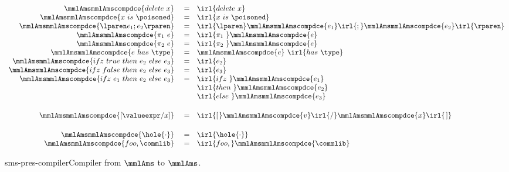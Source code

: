 \documentclass[a4paper,names,dvipsnames]{article}
\begin{document}
{\begin{center}
$$\begin{array}{rll}
    \mmlAmsmmlAmscompdce{delete\ x} &\ = & \irl{delete\ x} \\
    \mmlAmsmmlAmscompdce{x\ is\ \poisoned} &\ = & \irl{x\ is\ \poisoned} \\
    \mmlAmsmmlAmscompdce{\lparen e_1;e_2\rparen} &\ = & \irl{\lparen}\mmlAmsmmlAmscompdce{e_1}\irl{;}\mmlAmsmmlAmscompdce{e_2}\irl{\rparen}\\
    \mmlAmsmmlAmscompdce{\pi_1\ e} &\ = & \irl{\pi_1\ }\mmlAmsmmlAmscompdce{e}\\
    \mmlAmsmmlAmscompdce{\pi_2\ e} &\ = & \irl{\pi_2\ }\mmlAmsmmlAmscompdce{e}\\
    \mmlAmsmmlAmscompdce{e\ has\ \type} &\ = & \mmlAmsmmlAmscompdce{e}\ \irl{has\ \type}\\
    \mmlAmsmmlAmscompdce{ifz\ true\ then\ e_2\ else\ e_3} &\ = & \irl{e_{2}}\\
    \mmlAmsmmlAmscompdce{ifz\ false\ then\ e_2\ else\ e_3} &\ = & \irl{e_{3}}\\
    \mmlAmsmmlAmscompdce{ifz\ e_1\ then\ e_2\ else\ e_3} &\ = & \irl{ifz\ }\mmlAmsmmlAmscompdce{e_1}\\
                                                        &&\irl{then\ }\mmlAmsmmlAmscompdce{e_2} \\
                                                        &&\irl{else\ }\mmlAmsmmlAmscompdce{e_3} \\[0.5cm]
    \mmlAmsmmlAmscompdce{\left[\valueexpr/x\right]}&\ = & \irl{\left[\right.}\mmlAmsmmlAmscompdce{v}\irl{/}\mmlAmsmmlAmscompdce{x}\irl{\left.\right]} \\[0.5cm]
    \mmlAmsmmlAmscompdce{\hole{\cdot}}&\ = & \irl{\hole{\cdot}} \\
    \mmlAmsmmlAmscompdce{foo,\commlib}&\ = & \irl{foo,}\mmlAmsmmlAmscompdce{\commlib} \\
    \end{array}
    $$
  \end{center}
}{sms-pres-compiler}{Compiler from $\mmlAms$ to $\mmlAms$.}
\end{document}
